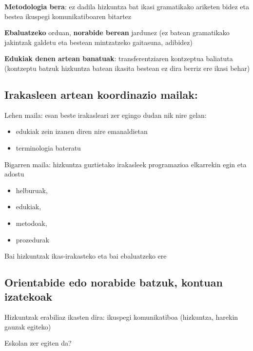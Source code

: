 \documentclass[
]{book}
\providecommand{\tightlist}{%
  \setlength{\itemsep}{0pt}\setlength{\parskip}{0pt}}
\begin{document}
\textbf{Metodologia bera}: ez dadila hizkuntza bat ikasi gramatikako ariketen bidez eta bestea ikuspegi komunikatiboaren bitartez

\textbf{Ebaluatzeko} orduan, \textbf{norabide berean} jardunez (ez batean gramatikako jakintzak galdetu eta bestean mintzatzeko gaitasuna, adibidez)

\textbf{Edukiak denen artean banatuak}: transferentziaren kontzeptua baliatuta (kontzeptu batzuk hizkuntza batean ikasita bestean ez dira berriz ere ikasi behar)

\hypertarget{irakasleen-artean-koordinazio-mailak}{%
\subsection{Irakasleen artean koordinazio mailak:}\label{irakasleen-artean-koordinazio-mailak}}

Lehen maila: esan beste irakasleari zer egingo dudan nik nire gelan:

\begin{itemize}
\tightlist
\item
  edukiak zein izanen diren nire emanaldietan
\item
  terminologia bateratu
\end{itemize}

Bigarren maila: hizkuntza guztietako irakasleek programazioa elkarrekin egin eta adostu

\begin{itemize}
\tightlist
\item
  helburuak,
\item
  edukiak,
\item
  metodoak,
\item
  prozedurak
\end{itemize}

Bai hizkuntzak ikas-irakasteko eta bai ebaluatzeko ere

\hypertarget{orientabide-edo-norabide-batzuk-kontuan-izatekoak}{%
\subsection*{Orientabide edo norabide batzuk, kontuan izatekoak}\label{orientabide-edo-norabide-batzuk-kontuan-izatekoak}}

Hizkuntzak erabiliaz ikasten dira: ikuspegi komunikatiboa (hizkuntza, harekin gauzak egiteko)

Eskolan zer egiten da?
\end{document}
